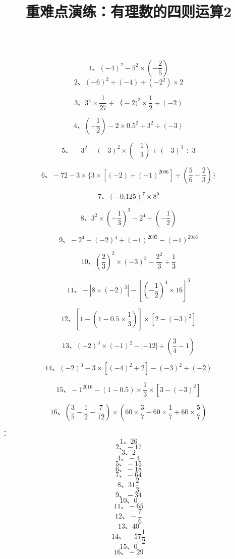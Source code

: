 \documentclass[fleqn]{article}
\title{重难点演练：有理数的四则运算2}
\begin{document}
  \hspace{4cm}{\Large 重难点演练3：有理数的混合运算}
  \\
	\noindent\[\text{1、}(-4)^2-5^2\times(-\frac25)\]
	\[\text{2、}(-6)^2\div(-4)+(-2^2)\times2\]

	\[\text{3、}3^4\times\frac1{27}+（-2)^2\times\frac12\div(-2)\]

	\[\text{4、}(-\frac12)-2\times0.5^2+3^2\div(-3)\]

	\[\text{5、}-3^2-(-3)^2\times(-\frac13)+(-3)^3\div3\]

	\[\text{6、}-72-3\times\{3\times[(-2)+(-1)^{2006}]\div(\frac56-\frac23)\}\]

	\[\text{7、}(-0.125)^7\times8^9\]

	\[\text{8、}3^2\times(-\frac13)^3-2^4\div(-\frac12)\]

	\[\text{9、}-2^4-(-2)^4+(-1)^{2005}-(-1)^{2016}\]

	\[\text{10、}(\frac23)^2\times(-3)^2-\frac{2^2}3\div\frac13\]

	\[\text{11、}-|8\times(-2)^3|-[(-\frac12)^4\times16]^3\]

	\[\text{12、}[1-(1-0.5\times\frac13)]\times[2-(-3)^2]\]

	\[\text{13、}(-2)^3\times(-1)^2-|-12|\div(\frac34-1)\]

	\[\text{14、}(-2)^3-3\times[(-4)^2+2]-(-3)^2\div(-2)\]

	\[\text{15、}-1^{2016}-(1-0.5)\times\frac13\times[3-(-3)^2]\]

	\[\text{16、}(\frac35-\frac12-\frac7{12})\times(60\times\frac37-60\times\frac17+60\times\frac57)\]

	\newpage
	：\\
	\[\text{1、}26\]
	\[\text{2、}-17\]
	\[\text{3、}2\]
	\[\text{4、}-4\]
	\[\text{5、}-15\]
	\[\text{6、}-18\]
	\[\text{7、}-64\]
	\[\text{8、}31\frac23\]
	\[\text{9、}-34\]
	\[\text{10、}0\]
	\[\text{11、}-65\]
	\[\text{12、}-\frac76\]
	\[\text{13、}40\]
	\[\text{14、}-57\frac12\]
	\[\text{15、}0\]
	\[\text{16、}-29\]
\end{document}
